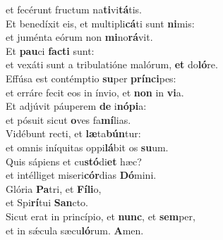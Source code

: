 \oddverse et fecérunt fructum na\textbf{ti}vi\textbf{tá}tis.\\
\evenverse Et benedíxit eis, et multipli\textbf{cá}ti sunt \textbf{ni}mis:~\*\\
\evenverse et juménta eórum non \textbf{mi}no\textbf{rá}vit.\\
\oddverse Et \textbf{pau}ci \textbf{fa}\textbf{cti} sunt:~\*\\
\oddverse et vexáti sunt a tribulatióne malórum, \textbf{et} do\textbf{ló}re.\\
\evenverse Effúsa est contémptio \textbf{su}per \textbf{prín}\textbf{ci}pes:~\*\\
\evenverse et erráre fecit eos in ínvio, et \textbf{non} in \textbf{vi}a.\\
\oddverse Et adjúvit páuperem \textbf{de} i\textbf{nó}\textbf{pi}a:~\*\\
\oddverse et pósuit sicut \textbf{o}ves fa\textbf{mí}lias.\\
\evenverse Vidébunt recti, et \textbf{læ}ta\textbf{bún}tur:~\*\\
\evenverse et omnis iníquitas oppi\textbf{lá}bit os \textbf{su}um.\\
\oddverse Quis sápiens et cu\textbf{stó}di\textbf{et} hæc?~\*\\
\oddverse et intélliget miseri\textbf{cór}dias \textbf{Dó}mini.\\
\evenverse Glória \textbf{Pa}tri, et \textbf{Fí}\textbf{li}o,~\*\\
\evenverse et Spi\textbf{rí}tui \textbf{San}cto.\\
\oddverse Sicut erat in princípio, et \textbf{nunc}, et \textbf{sem}per,~\*\\
\oddverse et in sǽcula sæcu\textbf{ló}rum. \textbf{A}men.\\
